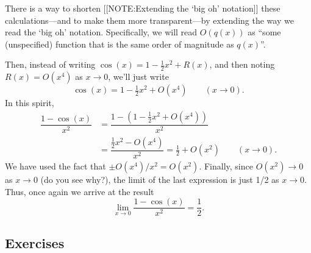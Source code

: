 There is a way to shorten        
[[NOTE:Extending the  `big oh' notation]]    
these calculations---and to make them more transparent---by extending
the way we read the `big oh' notation.  Specifically, we will read
$O(q(x))$ as ``some (unspecified) function that is the same order of
magnitude as $q(x)$''.

Then, instead of writing $\cos(x) = 1 - \tfrac{1}{2} x^2 +
R(x)$, and then noting $R(x) = O(x^4)$ as $x \to 0$, we'll just write
        \[
\cos(x) = 1 - \tfrac{1}{2} x^2 + O(x^4) \qquad (x \to 0).
\]
In this spirit,
\begin{align*}
\dfrac{1 - \cos(x)}{x^2} 
  &= \dfrac{1-\left(1-\tfrac{1}{2}x^2 + O(x^4)\right)}{x^2}\\[3pt]
  &= \dfrac{\tfrac{1}{2}x^2 - O(x^4)}{x^2}
     =  \tfrac{1}{2} +O(x^2) \qquad (x \to 0).
\end{align*}
We have used the fact that $\pm O(x^4)/x^2 = O(x^2)$.  Finally, since
$O(x^2) \to 0$ as $x \to 0$ (do you see why?), the limit of the last
expression is just 1/2 as $x \to 0$.  Thus, once again we arrive at
the result
        \[
\lim_{x \to 0} \dfrac{1 - \cos(x)}{x^2} = \dfrac{1}{2}.
\]

\subsection{Exercises}
\label{subsec:exercises}



